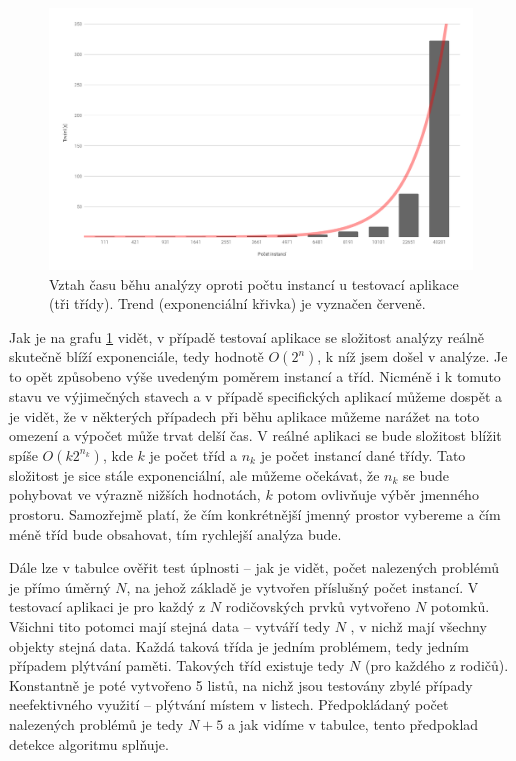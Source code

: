 \begin{figure}[ht!]
	\centering
	\includegraphics[scale=0.38]{obrazky/runtime.png}
	\caption{Vztah času běhu analýzy oproti počtu instancí u testovací aplikace (tři třídy). Trend (exponenciální křivka) je vyznačen červeně.}
	\label{obr-runtime}
\end{figure}

Jak je na grafu \ref{obr-runtime} vidět, v případě testovaí aplikace se složitost analýzy reálně skutečně blíží exponenciále, tedy hodnotě $O(2^n)$, k níž jsem došel v analýze. Je to opět způsobeno výše uvedeným poměrem instancí a tříd. Nicméně i k tomuto stavu ve výjimečných stavech a v případě specifických aplikací můžeme dospět a je vidět, že v některých případech při běhu aplikace můžeme narážet na toto omezení a výpočet může trvat delší čas. V reálné aplikaci se bude složitost blížit spíše $O(k2^{n_k})$, kde $k$ je počet tříd a $n_k$ je počet instancí dané třídy. Tato složitost je sice stále exponenciální, ale můžeme očekávat, že $n_k$ se bude pohybovat ve výrazně nižších hodnotách, $k$ potom ovlivňuje výběr jmenného prostoru. Samozřejmě platí, že čím konkrétnější jmenný prostor vybereme a čím méně tříd bude obsahovat, tím rychlejší analýza bude.

Dále lze v tabulce ověřit test úplnosti -- jak je vidět, počet nalezených problémů je přímo úměrný $N$, na jehož základě je vytvořen příslušný počet instancí. V testovací aplikaci je pro každý z $N$ rodičovských prvků vytvořeno $N$ potomků. Všichni tito potomci mají stejná data -- vytváří tedy $N$ , v nichž mají všechny objekty stejná data. Každá taková třída je jedním problémem, tedy jedním případem plýtvání paměti. Takových tříd existuje tedy $N$ (pro každého z rodičů). Konstantně je poté vytvořeno 5 listů, na nichž jsou testovány zbylé případy neefektivného využití -- plýtvání místem v listech. Předpokládaný počet nalezených problémů je tedy $N+5$ a jak vidíme v tabulce, tento předpoklad detekce algoritmu splňuje.

